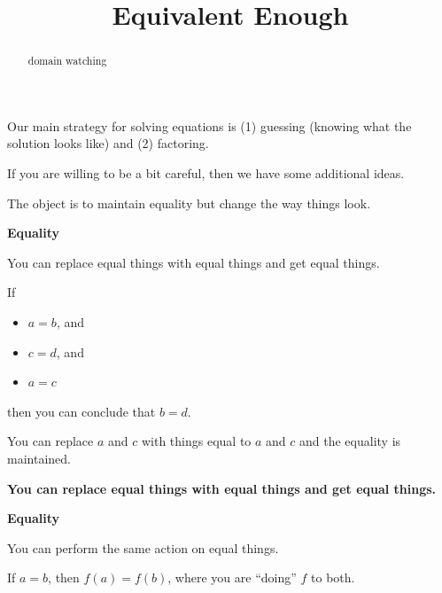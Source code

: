\documentclass{ximera}
\title{Equivalent Enough}
\begin{document}
\begin{abstract}
domain watching
\end{abstract}
\maketitle





Our main strategy for solving equations is (1) guessing (knowing what the solution looks like) and (2) factoring.




If you are willing to be a bit careful, then we have some additional ideas.

The object is to maintain equality but change the way things look.



\begin{observation} \textbf{\textcolor{-red!75}{Equality}}


You can replace equal things with equal things and get equal things.


If 
\begin{itemize}
\item $a=b$, and
\item $c=d$, and
\item $a=c$
\end{itemize}
then you can conclude that $b=d$.

You can replace $a$ and $c$ with things equal to $a$ and $c$ and the equality is maintained.


\end{observation}



\begin{center}

\textbf{\textcolor{purple!85!blue}{You can replace equal things with equal things and get equal things.}}

\end{center}



\begin{observation} \textbf{\textcolor{-red!75}{Equality}}


You can perform the same action on equal things.


If $a=b$, then $f(a) = f(b)$, where you are ``doing'' $f$ to both.



\end{observation}
\end{document}
